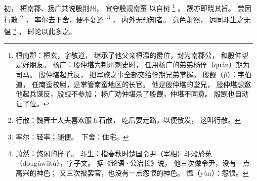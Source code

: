 
\switchcolumn*[\section{}]

初，
桓南郡、扬广共说殷荆州，
宜夺殷觊南蛮
以自树%
\footnote{%
    桓南郡：桓玄，字敬道，
            继承了他父亲桓温的爵位，封为南郡公，
            和殷仲堪是好朋友。
    杨广：殷仲堪为荆州刺史时，
          任用杨广的弟弟杨佺（quán）期为司马。
          殷仲堪起兵反，
          把军旅之事全部交给佺期兄弟掌握。
    殷觊（jì）：字伯道，
                任南蛮校尉，是掌管南蛮地区的长官。
                他是殷仲堪的堂兄，
                殷仲堪想邀他起兵谋反，殷觊不参加；
                杨广劝仲堪杀了殷觊，仲堪不同意。
                殷觊也自动让了位。
}%
。
觊亦即晓其旨。
尝因行散%
\footnote{%
    行散：魏晋士大夫喜欢服五石散，
          吃后要走路，以便散发，
          这叫行散。
}%
，
率尔去下舍，便不复\mbox{还%
\footnote{%
    率尔：轻率；随便。
    下舍：住宅。
}}%
，
内外无预知者。
意色萧然，
远同斗生之无愠%
\footnote{%
    萧然：悠闲的样子。
    斗生：指春秋时楚国令尹（宰相）斗穀於菟（dòugǔwūtú），字子文。
          据《论语·公冶长》说，
          他三次做令尹，没有一点高兴的神色；
          又三次被罢官，也没有一点怨恨的神色。
    愠（yùn）：怨恨。
}%
。
时论以此多之。

\switchcolumn




